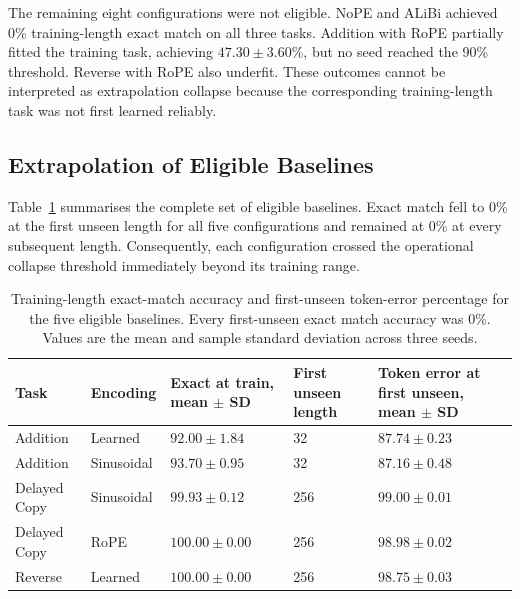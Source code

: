 \documentclass[
    author={Aanchala Ravindra Bhongade},
    supervisor={Dr. Fernando Moreno-Pino},
    degree={MSc},
    title={Length Generalisation in Transformer-Based Sequence Models: Failure Taxonomy and Mitigation Strategies},
    subtitle={},
    type={},
    year={2026}
]{dissertation}
\begin{document}
The remaining eight configurations were not eligible. NoPE and ALiBi achieved 0\% training-length exact match on all three tasks. Addition with RoPE partially fitted the training task, achieving \(47.30\pm3.60\%\), but no seed reached the 90\% threshold. Reverse with RoPE also underfit. These outcomes cannot be interpreted as extrapolation collapse because the corresponding training-length task was not first learned reliably.

\subsection{Extrapolation of Eligible Baselines}
\label{sec:eligible-extrapolation-results}

Table~\ref{tab:eligible-baseline-results} summarises the complete set of eligible baselines. Exact match fell to 0\% at the first unseen length for all five configurations and remained at 0\% at every subsequent length. Consequently, each configuration crossed the operational collapse threshold immediately beyond its training range.

\begin{table}[tbp]
\centering
\small
\renewcommand{\arraystretch}{1.15}
\begin{tabular}{
    p{}
    p{}
    p{}
    p{}
    p{}
}
\hline
\textbf{Task} &
\textbf{Encoding} &
\textbf{Exact at train, mean \(\boldsymbol{\pm}\) SD} &
\textbf{First unseen length} &
\textbf{Token error at first unseen, mean \(\boldsymbol{\pm}\) SD} \\
\hline

Addition &
Learned &
\(92.00\pm1.84\) &
32 &
\(87.74\pm0.23\) \\

Addition &
Sinusoidal &
\(93.70\pm0.95\) &
32 &
\(87.16\pm0.48\) \\

Delayed Copy &
Sinusoidal &
\(99.93\pm0.12\) &
256 &
\(99.00\pm0.01\) \\

Delayed Copy &
RoPE &
\(100.00\pm0.00\) &
256 &
\(98.98\pm0.02\) \\

Reverse &
Learned &
\(100.00\pm0.00\) &
256 &
\(98.75\pm0.03\) \\
\hline
\end{tabular}
\caption{Training-length exact-match accuracy and first-unseen token-error percentage for the five eligible baselines. Every first-unseen exact match accuracy was 0\%. Values are the mean and sample standard deviation across
three seeds.}
\label{tab:eligible-baseline-results}
\end{table}
\end{document}
